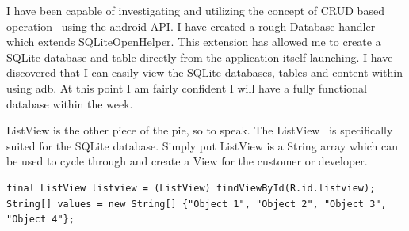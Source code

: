\documentclass[fontsize=11pt, %
paper=a4, %
twoside, %
captions=tableheading,
index=totoc,
hyperref]{labbook}
\begin{document}
\begin{addmargin}[4cm]{0cm} %

\pagestyle{scrheadings} %


\labday{\today}

\begin{onehalfspace}
I have been capable of investigating and utilizing the concept of CRUD based operation~\citep{Ravi} using the android API. I have created a rough Database handler which extends SQLiteOpenHelper\citep{sqlite, helper}. This extension has allowed me to create a SQLite database and table directly from the application itself launching. I have discovered that I can easily view the SQLite databases, tables and content within using adb. At this point I am fairly confident I will have a fully functional database within the week.
\end{onehalfspace}
ListView is the other piece of the pie, so to speak. The ListView~\citep{listview} is specifically suited for the SQLite database. Simply put ListView is a String array which can be used to cycle through and create a View for the customer or developer. 
\begin{verbatim}
final ListView listview = (ListView) findViewById(R.id.listview);
String[] values = new String[] {"Object 1", "Object 2", "Object 3", "Object 4"};


\end{verbatim}
\end{addmargin}
\end{document}

